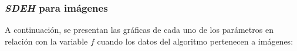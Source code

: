 \subsubsection{\emph{SDEH} para imágenes}

	A continuación, se presentan las gráficas de cada uno de los
parámetros en relación con la variable $f$ cuando los datos
del algoritmo pertenecen a imágenes:

\begin{figure}[H]
  \centering
  \label{fig:f_sde1}
\end{figure}

